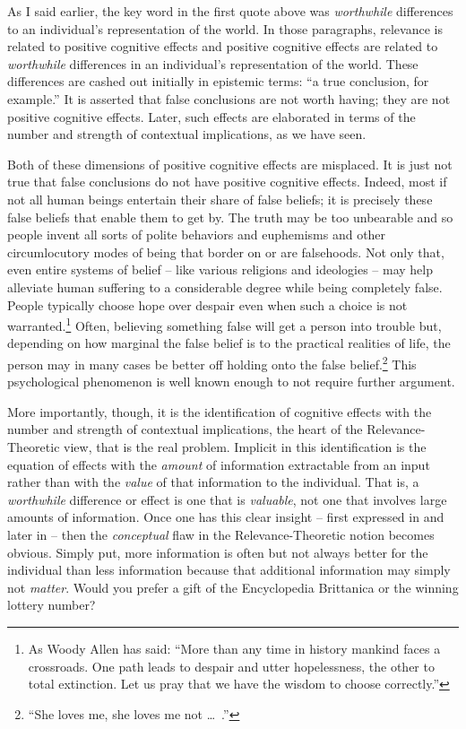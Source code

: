 As I said earlier, the key word in the first quote above was \emph{worthwhile} differences to an individual's representation of the world. In those paragraphs, relevance is related to positive cognitive effects and positive cognitive effects are related to \emph{worthwhile} differences in an individual's representation of the world. These differences are cashed out initially in epistemic terms: ``a true conclusion, for example.'' It is asserted that false conclusions are not worth having; they are not positive cognitive effects. Later, such effects are elaborated in terms of the number and strength of contextual implications, as we have seen.

Both of these dimensions of positive cognitive effects are misplaced. It is just not true that false conclusions do not have positive cognitive effects. Indeed, most if not all human beings entertain their share of false beliefs; it is precisely these false beliefs that enable them to get by. The truth may be too unbearable and so people invent all sorts of polite behaviors and euphemisms and other circumlocutory modes of being that border on or are falsehoods. Not only that, even entire systems of belief -- like various religions and ideologies -- may help alleviate human suffering to a considerable degree while being completely false. People typically choose hope over despair even when such a choice is not warranted.\footnote{As Woody Allen has said: ``More than any time in history mankind faces a crossroads. One path leads to despair and utter hopelessness, the other to total extinction. Let us pray that we have the wisdom to choose correctly.''} Often, believing something false will get a person into trouble but, depending on how marginal the false belief is to the practical realities of life, the person may in many cases be better off holding onto the false belief.\footnote{``She loves me, she loves me not \ldots\ .''} This psychological phenomenon is well known enough to not require further argument.

More importantly, though, it is the identification of cognitive effects with the number and strength of contextual implications, the heart of the Relevance-Theoretic view, that is the real problem. Implicit in this identification is the equation of effects with the \emph{amount} of information extractable from an input rather than with the \emph{value} of that information to the individual. That is, a \emph{worthwhile} difference or effect is one that is \emph{valuable}, not one that involves large amounts of information. Once one has this clear insight -- first expressed in \citet{parikh:gtai} and later in \citet{parikh:rs, parikh:le} -- then the \emph{conceptual} flaw in the Relevance-Theoretic notion becomes obvious. Simply put, more information is often but not always better for the individual than less information because that additional information may simply not \emph{matter}. Would you prefer a gift of the Encyclopedia Brittanica or the winning lottery number?


